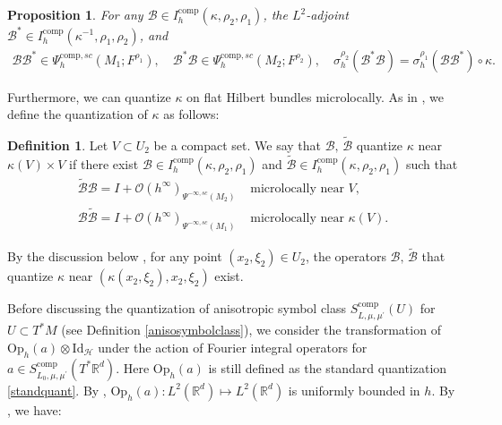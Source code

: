 \documentclass[11pt,oneside,reqno]{amsart}
\newcommand\R{\ensuremath{\mathbb{R}}}
\newcommand\Oph{\ensuremath{\mathrm{Op}_h}}
\newtheorem{proposition}[theorem]{Proposition}
\theoremstyle{definition}
\newtheorem{definition}{Definition}[section]
\numberwithin{equation}{section}
\theoremstyle{plain}
\begin{document}
\begin{proposition}\label{propofadjoint}
For any $\mathcal{B} \in I^{\mathrm{comp}}_h(\kappa,\rho_{2},\rho_{1})$, the $L^2$-adjoint $\mathcal{B}^*\in  I^{\mathrm{comp}}_h(\kappa^{-1},\rho_{1},\rho_{2})$, and 
 \begin{equation}
 \begin{aligned}
 \mathcal{B}\mathcal{B}^*\in \Psi_{h}^{\mathrm{comp},sc}(M_{1};F^{\rho_1}), \quad \mathcal{B}^*\mathcal{B}\in \Psi_{h}^{\mathrm{comp},sc}(M_{2};F^{\rho_2}), \quad \sigma_{h}^{\rho_{2}}(\mathcal{B}^*\mathcal{B})=\sigma^{\rho_{1}}_{h}(\mathcal{B}\mathcal{B}^*)\circ \kappa.
 \end{aligned}
 \end{equation}
\end{proposition}


Furthermore, we can quantize $\kappa$ on flat Hilbert bundles microlocally. As in \cite[(2.13)]{dyatlovzahl2016spectral}, we define the quantization of $\kappa$ as follows:


\begin{definition}\label{quantizesymponflatbundle}
Let $V\subset U_{2}$ be a compact set. We say that $\mathcal{B}, \,\widetilde{\mathcal{B}}$ quantize $\kappa$ near $\kappa(V) \times V$ if there exist $\mathcal{B}\in I^{\mathrm{comp}}_h(\kappa,\rho_{2},\rho_{1})$ and $\widetilde{\mathcal{B}}\in I^{\mathrm{comp}}_h(\kappa,\rho_{2},\rho_{1})$ such that
\begin{equation}
\begin{array}{ll}
\widetilde{\mathcal{B}}\mathcal{B}=I+\mathcal{O} (h^{\infty} )_{\Psi^{-\infty,sc}(M_2)}& \text { microlocally near } V,\\
\mathcal{B}\widetilde{\mathcal{B}}=I+\mathcal{O} (h^{\infty} )_{\Psi^{-\infty,sc}(M_1)} & \text { microlocally near } \kappa(V).
\end{array}
\end{equation}
\end{definition}

By the discussion below \cite[(2.13)]{dyatlovzahl2016spectral}, for any point $(x_2,\xi_2)\in U_2$, the operators $\mathcal{B},\,\widetilde{\mathcal{B}}$ that quantize $\kappa$ near $(\kappa(x_2,\xi_2),x_2,\xi_2)$ exist.

Before discussing the quantization of anisotropic symbol class $S^{\mathrm{comp}}_{L,\mu,\mu^{\prime}}(U)$ for $U\subset T^*M$ (see Definition \ref{anisosymbolclass}), we consider the transformation of $\Oph(a)\otimes \mathrm{Id}_{\mathcal{H}}$ under the action of Fourier integral operators for $a \in S^{\mathrm{comp}}_{L_0,\mu,\mu^{\prime}}(T^*\R^{d})$. Here $\Oph(a)$ is still defined as the standard quantization \eqref{standquant}. By \cite[Appendix A.2]{dyatlov2018semiclassical}, $\Oph(a): L^2(\R^d)\mapsto L^2(\R^d)$ is uniformly bounded in $h$. By \cite[Lemma 3.10]{dyatlovzahl2016spectral}, we have:
\end{document}
